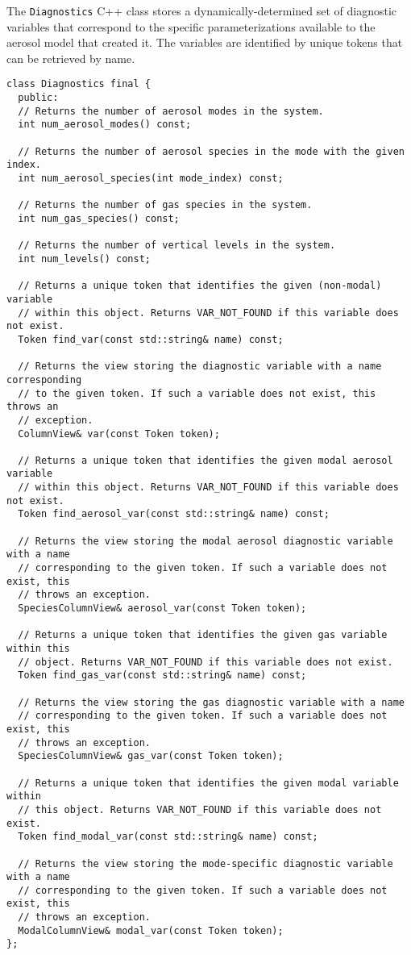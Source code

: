 The \texttt{Diagnostics} C++ class stores a dynamically-determined set of
diagnostic variables that correspond to the specific parameterizations available
to the aerosol model that created it. The variables are identified by unique
tokens that can be retrieved by name.

\lstset{language=[11]c++}
\begin{lstlisting}
class Diagnostics final {
  public:
  // Returns the number of aerosol modes in the system.
  int num_aerosol_modes() const;

  // Returns the number of aerosol species in the mode with the given index.
  int num_aerosol_species(int mode_index) const;

  // Returns the number of gas species in the system.
  int num_gas_species() const;

  // Returns the number of vertical levels in the system.
  int num_levels() const;

  // Returns a unique token that identifies the given (non-modal) variable
  // within this object. Returns VAR_NOT_FOUND if this variable does not exist.
  Token find_var(const std::string& name) const;

  // Returns the view storing the diagnostic variable with a name corresponding
  // to the given token. If such a variable does not exist, this throws an
  // exception.
  ColumnView& var(const Token token);

  // Returns a unique token that identifies the given modal aerosol variable
  // within this object. Returns VAR_NOT_FOUND if this variable does not exist.
  Token find_aerosol_var(const std::string& name) const;

  // Returns the view storing the modal aerosol diagnostic variable with a name
  // corresponding to the given token. If such a variable does not exist, this
  // throws an exception.
  SpeciesColumnView& aerosol_var(const Token token);

  // Returns a unique token that identifies the given gas variable within this
  // object. Returns VAR_NOT_FOUND if this variable does not exist.
  Token find_gas_var(const std::string& name) const;

  // Returns the view storing the gas diagnostic variable with a name
  // corresponding to the given token. If such a variable does not exist, this
  // throws an exception.
  SpeciesColumnView& gas_var(const Token token);

  // Returns a unique token that identifies the given modal variable within
  // this object. Returns VAR_NOT_FOUND if this variable does not exist.
  Token find_modal_var(const std::string& name) const;

  // Returns the view storing the mode-specific diagnostic variable with a name
  // corresponding to the given token. If such a variable does not exist, this
  // throws an exception.
  ModalColumnView& modal_var(const Token token);
};
\end{lstlisting}

